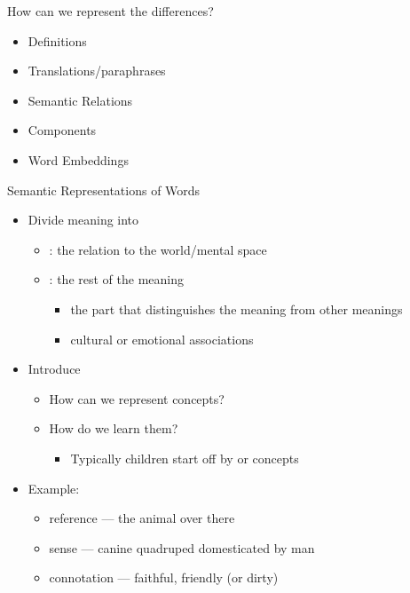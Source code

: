 \documentclass{beamer}
\begin{document}
\begin{frame}{How can we represent the differences?}

\begin{itemize}
\item Definitions
\item Translations/paraphrases
\item Semantic Relations
\item Components
\item Word Embeddings
\end{itemize}

\end{frame}

\begin{frame}{Semantic Representations of Words}

\begin{itemize}\addtolength{\itemsep}{-1ex}
\item Divide meaning into
  \begin{itemize}
  \item {}: the relation to the world/mental space
  \item {}: the rest of the meaning
    \begin{itemize}
    \item {} the part that distinguishes the meaning
      from other meanings
    \item {}  cultural or emotional associations 
    \end{itemize}
  \end{itemize}
\item Introduce  %
  \begin{itemize}
  \item How can we represent concepts?
  \item How do we learn them?
    \begin{itemize}
    \item Typically children start off by  or  concepts
    \end{itemize}
  \end{itemize}
\item Example: 
  \begin{itemize}
  \item reference --- the animal over there
  \item sense --- canine quadruped domesticated by man
  \item connotation --- faithful, friendly (or dirty)
  \end{itemize}
\end{itemize}


\end{frame}
\end{document}
